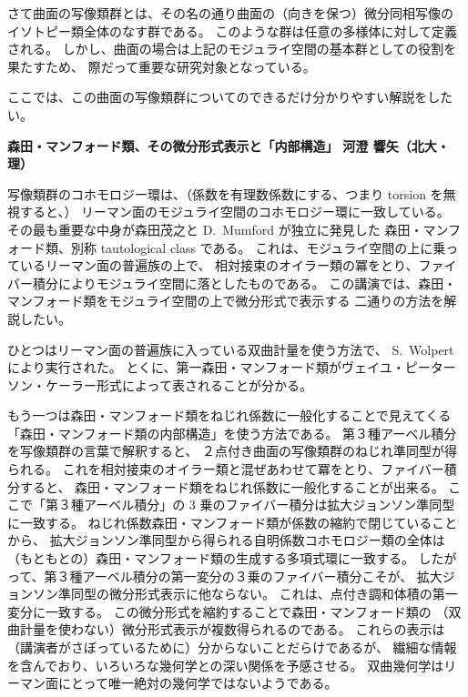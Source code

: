 \documentclass[uplatex,dvipdfmx]{jlreq}
\begin{document}
さて曲面の写像類群とは、その名の通り曲面の（向きを保つ）微分同相写像の
イソトピー類全体のなす群である。
このような群は任意の多様体に対して定義される。
しかし、曲面の場合は上記のモジュライ空間の基本群としての役割を果たすため、
際だって重要な研究対象となっている。

ここでは、この曲面の写像類群についてのできるだけ分かりやすい解説をしたい。

\newpage

\noindent
{\large\bfseries 森田・マンフォード類、その微分形式表示と「内部構造」}
\hfill
{\large\bfseries 河澄 響矢（北大・理）}

\medskip

写像類群のコホモロジー環は、（係数を有理数係数にする、つまり torsion を無視すると、）
リーマン面のモジュライ空間のコホモロジー環に一致している。
その最も重要な中身が森田茂之と D.~Mumford が独立に発見した
森田・マンフォード類、別称 tautological class である。
これは、モジュライ空間の上に乗っているリーマン面の普遍族の上で、
相対接束のオイラー類の冪をとり、ファイバー積分によりモジュライ空間に落としたものである。
この講演では、森田・マンフォード類をモジュライ空間の上で微分形式で表示する
二通りの方法を解説したい。

ひとつはリーマン面の普遍族に入っている双曲計量を使う方法で、
S.~Wolpert により実行された。
とくに、第一森田・マンフォード類がヴェイユ・ピーターソン・ケーラー形式によって表されることが分かる。

もう一つは森田・マンフォード類をねじれ係数に一般化することで見えてくる
「森田・マンフォード類の内部構造」を使う方法である。
第３種アーベル積分を写像類群の言葉で解釈すると、
２点付き曲面の写像類群のねじれ準同型が得られる。
これを相対接束のオイラー類と混ぜあわせて冪をとり、ファイバー積分すると、
森田・マンフォード類をねじれ係数に一般化することが出来る。
ここで「第３種アーベル積分」の $3$ 乗のファイバー積分は拡大ジョンソン準同型に一致する。
ねじれ係数森田・マンフォード類が係数の縮約で閉じていることから、
拡大ジョンソン準同型から得られる自明係数コホモロジー類の全体は
（もともとの）森田・マンフォード類の生成する多項式環に一致する。
したがって、第３種アーベル積分の第一変分の３乗のファイバー積分こそが、
拡大ジョンソン準同型の微分形式表示に他ならない。
これは、点付き調和体積の第一変分に一致する。
この微分形式を縮約することで森田・マンフォード類の
（双曲計量を使わない）微分形式表示が複数得られるのである。
これらの表示は（講演者がさぼっているために）分からないことだらけであるが、
繊細な情報を含んでおり、いろいろな幾何学との深い関係を予感させる。
双曲幾何学はリーマン面にとって唯一絶対の幾何学ではないようである。
\end{document}
